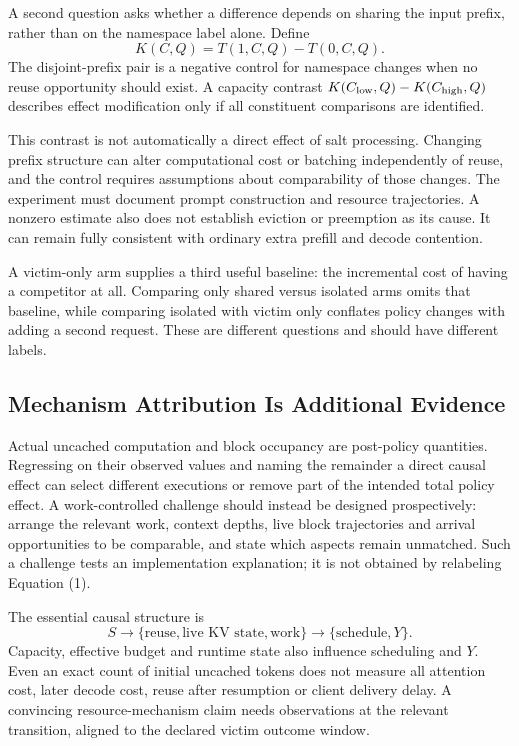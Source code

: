 \documentclass[a4paper,twoside]{article}
\begin{document}
A second question asks whether a difference depends on sharing the input prefix, rather than on the namespace label alone. Define
\begin{equation}
 K(C,Q)=T(1,C,Q)-T(0,C,Q).
\end{equation}
The disjoint-prefix pair is a negative control for namespace changes when no reuse opportunity should exist. A capacity contrast $K(C_{\rm low},Q)-K(C_{\rm high},Q)$ describes effect modification only if all constituent comparisons are identified.

This contrast is not automatically a direct effect of salt processing. Changing prefix structure can alter computational cost or batching independently of reuse, and the control requires assumptions about comparability of those changes. The experiment must document prompt construction and resource trajectories. A nonzero estimate also does not establish eviction or preemption as its cause. It can remain fully consistent with ordinary extra prefill and decode contention.

A victim-only arm supplies a third useful baseline: the incremental cost of having a competitor at all. Comparing only shared versus isolated arms omits that baseline, while comparing isolated with victim only conflates policy changes with adding a second request. These are different questions and should have different labels.

\subsection{Mechanism Attribution Is Additional Evidence}

Actual uncached computation and block occupancy are post-policy quantities. Regressing on their observed values and naming the remainder a direct causal effect can select different executions or remove part of the intended total policy effect. A work-controlled challenge should instead be designed prospectively: arrange the relevant work, context depths, live block trajectories and arrival opportunities to be comparable, and state which aspects remain unmatched. Such a challenge tests an implementation explanation; it is not obtained by relabeling Equation (1).

The essential causal structure is
\[
 S\longrightarrow\{\text{reuse},\text{live KV state},\text{work}\}
 \longrightarrow\{\text{schedule},Y\}.
\]
Capacity, effective budget and runtime state also influence scheduling and $Y$. Even an exact count of initial uncached tokens does not measure all attention cost, later decode cost, reuse after resumption or client delivery delay. A convincing resource-mechanism claim needs observations at the relevant transition, aligned to the declared victim outcome window.
\end{document}
